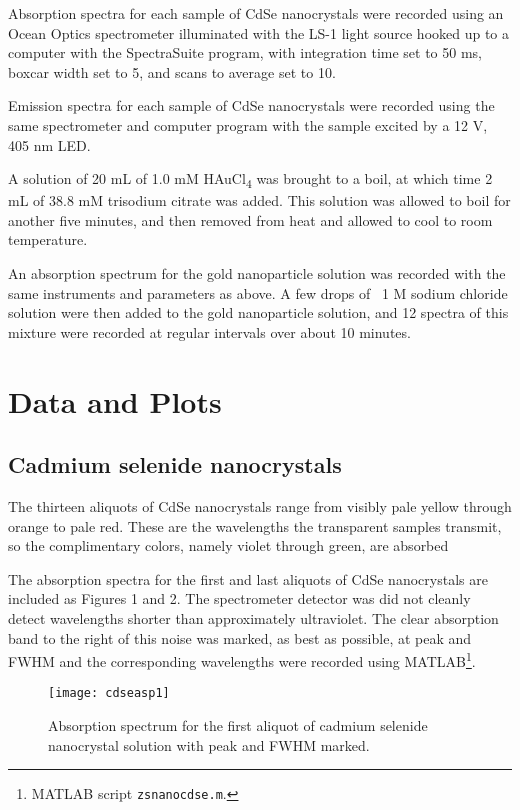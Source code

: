 \documentclass{article}
\begin{document}
Absorption spectra for each sample of CdSe nanocrystals were recorded using an Ocean 
Optics spectrometer illuminated with the LS-1 light source hooked up to a computer with 
the SpectraSuite program,
with integration time set to 50 ms, boxcar width set to 5, and scans to average set to 10.

Emission spectra for each sample of CdSe nanocrystals were recorded using the same 
spectrometer and computer program with the sample excited by a 12 V, 405 nm LED.

A solution of 20 mL of 1.0 mM HAuCl\textsubscript{4} was brought to a boil, at which time
2 mL of 38.8 mM trisodium citrate was added. This solution was allowed to boil for another
five minutes, and then removed from heat and allowed to cool to room temperature.

An absorption spectrum for the gold nanoparticle solution was recorded with the same 
instruments and parameters as above. A few drops of ~1 M sodium chloride solution were
then added to the gold nanoparticle solution, and 12 spectra of this mixture were recorded 
at regular intervals over about 10 minutes.

\section{Data and Plots}

\subsection{Cadmium selenide nanocrystals}

The thirteen aliquots of CdSe nanocrystals range from visibly pale yellow through orange to 
pale red. These are the wavelengths the transparent samples transmit, so the complimentary 
colors, namely violet through green, are absorbed

The absorption spectra for the first and last aliquots of CdSe nanocrystals are included as
Figures 1 and 2. The spectrometer detector was did not cleanly detect wavelengths shorter 
than approximately ultraviolet. The clear absorption band to the right of this noise was 
marked, as best as possible, at peak and FWHM and the corresponding wavelengths were
recorded using MATLAB\footnote{MATLAB script \texttt{zs\textunderscore nanocdse.m}.}.

\begin{figure}[H]
\texttt{[image: cdseasp1]}
\centering
\caption{Absorption spectrum for the first aliquot of cadmium selenide nanocrystal solution
with peak and FWHM marked.}
\end{figure}
\end{document}
